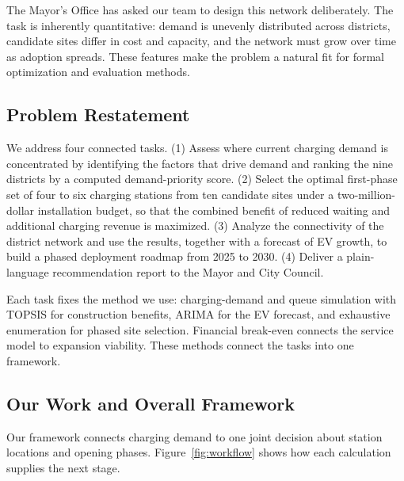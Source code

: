\documentclass[12pt]{article}
\begin{document}
The Mayor's Office has asked our team to design this network deliberately. The task is
inherently quantitative: demand is unevenly distributed across districts, candidate sites
differ in cost and capacity, and the network must grow over time as adoption spreads.
These features make the problem a natural fit for formal optimization and evaluation
methods.

\subsection{Problem Restatement}

We address four connected tasks. (1) Assess where current charging demand is concentrated
by identifying the factors that drive demand and ranking the nine districts by a computed
demand-priority score. (2) Select the optimal first-phase set of four to six charging
stations from ten candidate sites under a two-million-dollar installation budget, so that
the combined benefit of reduced waiting and additional charging revenue is maximized.
(3) Analyze the connectivity of the district
network and use the results, together with a forecast of EV growth, to build a phased
deployment roadmap from 2025 to 2030. (4) Deliver a plain-language recommendation report
to the Mayor and City Council.

Each task fixes the method we use: charging-demand and queue simulation with TOPSIS
for construction benefits, ARIMA for the EV forecast, and exhaustive enumeration for
phased site selection. Financial break-even connects the service model to expansion
viability. These methods connect the tasks into one framework.

\clearpage
\subsection{Our Work and Overall Framework}
Our framework connects charging demand to one joint decision about station locations
and opening phases. Figure~\ref{fig:workflow} shows how each calculation supplies the
next stage.
\end{document}
